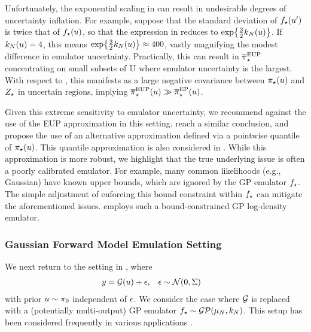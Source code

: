 \documentclass[12pt]{article}
\begin{document}
Unfortunately, the exponential scaling in  can result in
undesirable degrees of uncertainty inflation. For example, suppose that 
the standard deviation of ${f}_{\star}(u^\prime)$ is twice that of ${f}_{\star}(u)$, so that 
the expression in  reduces to $\exp\mathopen{}\left\{\frac{3}{2}k_{N}(u)\right\}\mathclose{}$.
If $k_{N}(u) = 4$, this means
$\exp\mathopen{}\left\{\frac{3}{2}k_{N}(u)\right\}\mathclose{} \approx 400$, vastly magnifying the modest difference 
in emulator uncertainty. Practically, this can result in ${\overline{\pi}}_{\star}^{\mathrm{EUP}}$ concentrating 
on small subsets of $\mathbb{U}$ where emulator uncertainty is the largest.
With respect to , this manifests as a large negative covariance 
between ${\pi}_{\star}(u)$ and ${Z}_{\star}$ in uncertain regions, implying 
${\overline{\pi}}_{\star}^{\mathrm{EUP}}(u) \gg {\overline{\pi}}_{\star}^{\mathrm{EP}}(u)$. 

Given this extreme sensitivity to emulator uncertainty, we recommend against the use of the EUP
approximation in this setting. \citet{VehtariParallelGP} reach a similar conclusion, and propose
the use of an alternative approximation defined via a pointwise quantile of ${\pi}_{\star}(u)$.
This quantile approximation is also considered in \citet{quantileApprox,FATES_CES}.
While this approximation is more robust, we highlight that the true underlying issue is often 
a poorly calibrated emulator. For example, many common likelihoods (e.g., Gaussian) 
have known upper bounds, which are ignored by the GP emulator ${f}_{\star}$. The simple 
adjustment of enforcing this bound constraint within ${f}_{\star}$ can mitigate the aforementioned issues.
\citet{quantileApprox} employs such a bound-constrained GP log-density emulator.

\subsubsection{Gaussian Forward Model Emulation Setting} \label{sec:fwd-Gaussian} 
We next return to the setting in , where
\begin{align}
&y = \mathcal{G}(u) + \epsilon, &&\epsilon \sim \mathcal{N}(0, \Sigma)
\end{align}
with prior $u \sim \pi_0$ independent of $\epsilon$. We consider the case 
where $\mathcal{G}$ is replaced with a (potentially multi-output) GP emulator 
${f}_{\star} \sim \mathcal{GP}(\mu_{N}, k_{N})$. This setup has been considered frequently in various 
applications \citep{Surer2023sequential,weightedIVAR,StuartTeck2,GP_PDE_priors,CES,
idealizedGCM,villani2024posteriorsamplingadaptivegaussian,hydrologicalModel,hydrologicalModel2}.
\end{document}
